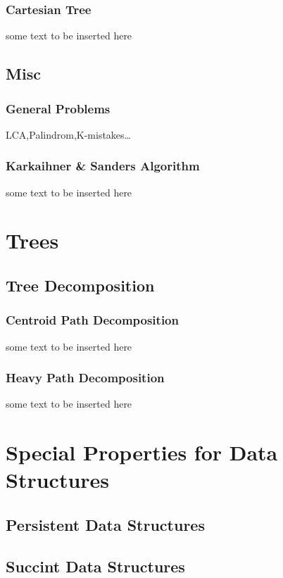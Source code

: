 \documentclass[11pt]{book}
\begin{document}
\subsection{Cartesian Tree}
some text to be inserted here
\newpage

\section{Misc}
\subsection{General Problems}
LCA,Palindrom,K-mistakes\ldots{}
\newpage

\subsection{Karkaihner \& Sanders Algorithm}
some text to be inserted here
\newpage

\chapter{Trees}
\section{Tree Decomposition}
\subsection{Centroid Path Decomposition}
some text to be inserted here
\newpage

\subsection{Heavy Path Decomposition}
some text to be inserted here
\newpage

\chapter{Special Properties for Data Structures}
\section{Persistent Data Structures}
\newpage

\section{Succint Data Structures}




\end{document}
